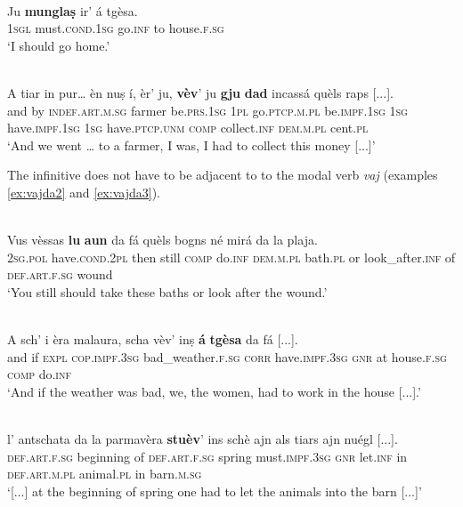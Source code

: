 \ea\label{ex:mung1}
\\
\gll  Ju \textbf{munglaṣ} ir' á tgèsa.\\
\textsc{1sgl}  must.\textsc{cond.1sg} go.\textsc{inf} to house.\textsc{f.sg} \\
\glt `I should go home.'
\z

\ea\label{ex:vajda1}
\\
\gll    A tiar in pur… èn nuṣ í, èr’ ju, \textbf{vèv}’ ju \textbf{gju} \textbf{dad} incassá quèls raps [...].\\ 
and by \textsc{indef.art.m.sg} farmer  be.\textsc{prs.1sg} \textsc{1pl} go.\textsc{ptcp.m.pl}  be.\textsc{impf.1sg} \textsc{1sg}  have.\textsc{impf.1sg} \textsc{1sg} have.\textsc{ptcp.unm} \textsc{comp} collect.\textsc{inf}  \textsc{dem.m.pl} cent.\textsc{pl}\\
\glt `And we went … to a farmer, I was, I had to collect this money [...]'
\z


The infinitive does not have to be adjacent to to the modal verb \textit{vaj} (examples \ref{ex:vajda2} and \ref{ex:vajda3}). 

\ea
\label{ex:vajda2}
\\
\gll  Vus vèssas \textbf{lu} \textbf{aun} da fá quèls bogns né mirá da la plaja.\\
\textsc{2sg.pol}  have.\textsc{cond.2pl} then still \textsc{comp} do.\textsc{inf} \textsc{dem.m.pl} bath.\textsc{pl} or look\_after.\textsc{inf} of \textsc{def.art.f.sg} wound\\
\glt `You  still should take these baths or look after the wound.'
\z

\ea
\label{ex:vajda3}
\\
\gll A sch’ i èra malaura, scha vèv’ inṣ \textbf{á} \textbf{tgèsa} da fá [...].\\
and if \textsc{expl} \textsc{cop.impf.3sg} bad\_weather.\textsc{f.sg} \textsc{corr} have.\textsc{impf.3sg} \textsc{gnr} at house.\textsc{f.sg} \textsc{comp} do.\textsc{inf} \\
\glt `And if the weather was bad, we, the women, had to work in the house [...].'
\z

\ea
\label{ex:stuaj1}
\\
\gll  [...] l’ antschata da la parmavèra \textbf{stuèv}’ ins schè ajn als tiars ajn nuégl [...]. \\
{} \textsc{def.art.f.sg} beginning of \textsc{def.art.f.sg} spring must.\textsc{impf.3sg} \textsc{gnr} let.\textsc{inf} in \textsc{def.art.m.pl} animal.\textsc{pl} in barn.\textsc{m.sg}\\
\glt `[...] at the beginning of spring one had to let the animals into the barn [...]'
\z

